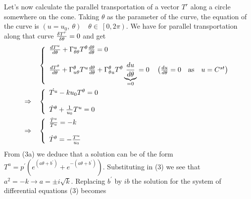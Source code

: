 Let's now calculate the parallel transportation of a vector $T^r$ along a circle somewhere on the cone. Taking $\theta$ as the parameter of the curve, the equation of the curve is $(u=u_0,\ \theta) \quad \theta \in \ \left[0, 2\pi \right)$. We have for parallel transportation along that curve $\fdv{T^r}{\theta}=0$ and get
\begin{align}
 & \left \{ \begin{array}{l}
\dv{T^u}{\theta} + \Gamma^u_{\theta \theta}T^{\theta}\dv{\theta}{\theta} =0\\\\
\dv{T^{\theta}}{\theta} + \Gamma^{\theta}_{u \theta}T^{u}\dv{\theta}{\theta}+ \Gamma^{\theta}_{\theta u}T^{\theta}\underbrace{\dv{u}{\theta}}_{=0} =0\quad \left(\dv{u}{\theta} = 0 \quad \text{as} \quad u= C^{st} \right)
\end{array} \right.\\
\Rightarrow \quad
 & \left \{ \begin{array}{l}
\dot{T^u} -ku_0 T^{\theta}=0\\\\
\dot{T}^{\theta} + \frac{1}{u_0}T^{u}=0
\end{array} \right.\\
\Rightarrow \quad
 & \left \{ \begin{array}{l}
\frac{\ddot{T}^u}{T^{u}} = -k\\\\
\dot{T}^{\theta} =- \frac{T^{u}}{u_0}
\end{array} \right.
\end{align}
From (3a) we deduce that a solution can be of the form\\ $T^u = p^{'}\left( e^{(a \theta + b^{'})}+ e^{-(a \theta + b^{'})}\right)$. Substituting in (3) we see that $a^2 = -k \rightarrow a = \pm i\sqrt{k}$. Replacing $b^{'}$ by $ib$ the solution for the system of differential equations (3) becomes
